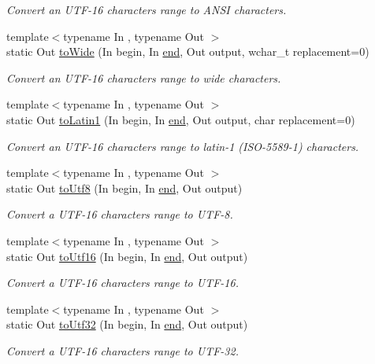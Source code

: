 \begin{DoxyCompactItemize}
\begin{DoxyCompactList}\small\item\em Convert an U\-T\-F-\/16 characters range to A\-N\-S\-I characters. \end{DoxyCompactList}\item 
{\footnotesize template$<$typename In , typename Out $>$ }\\static Out \hyperlink{classsf_1_1_utf_3_0116_01_4_a42bace5988f7f20497cfdd6025c2d7f2}{to\-Wide} (In begin, In \hyperlink{gl3_8h_a432111147038972f06e049e18a837002}{end}, Out output, wchar\-\_\-t replacement=0)
\begin{DoxyCompactList}\small\item\em Convert an U\-T\-F-\/16 characters range to wide characters. \end{DoxyCompactList}\item 
{\footnotesize template$<$typename In , typename Out $>$ }\\static Out \hyperlink{classsf_1_1_utf_3_0116_01_4_ad0cc57ebf48fac584f4d5f3d30a20010}{to\-Latin1} (In begin, In \hyperlink{gl3_8h_a432111147038972f06e049e18a837002}{end}, Out output, char replacement=0)
\begin{DoxyCompactList}\small\item\em Convert an U\-T\-F-\/16 characters range to latin-\/1 (I\-S\-O-\/5589-\/1) characters. \end{DoxyCompactList}\item 
{\footnotesize template$<$typename In , typename Out $>$ }\\static Out \hyperlink{classsf_1_1_utf_3_0116_01_4_afdd2f31536ce3fba4dfb632dfdd6e4b7}{to\-Utf8} (In begin, In \hyperlink{gl3_8h_a432111147038972f06e049e18a837002}{end}, Out output)
\begin{DoxyCompactList}\small\item\em Convert a U\-T\-F-\/16 characters range to U\-T\-F-\/8. \end{DoxyCompactList}\item 
{\footnotesize template$<$typename In , typename Out $>$ }\\static Out \hyperlink{classsf_1_1_utf_3_0116_01_4_a0c9744c8f142360a8afebb24da134b34}{to\-Utf16} (In begin, In \hyperlink{gl3_8h_a432111147038972f06e049e18a837002}{end}, Out output)
\begin{DoxyCompactList}\small\item\em Convert a U\-T\-F-\/16 characters range to U\-T\-F-\/16. \end{DoxyCompactList}\item 
{\footnotesize template$<$typename In , typename Out $>$ }\\static Out \hyperlink{classsf_1_1_utf_3_0116_01_4_a781174f776a3effb96c1ccd9a4513ab1}{to\-Utf32} (In begin, In \hyperlink{gl3_8h_a432111147038972f06e049e18a837002}{end}, Out output)
\begin{DoxyCompactList}\small\item\em Convert a U\-T\-F-\/16 characters range to U\-T\-F-\/32. \end{DoxyCompactList}\end{DoxyCompactItemize}


